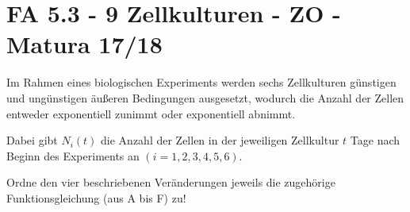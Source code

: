 \section{FA 5.3 - 9 Zellkulturen - ZO - Matura 17/18}

\begin{beispiel}[FA 5.3]{1} %
Im Rahmen eines biologischen Experiments werden sechs Zellkulturen günstigen und ungünstigen äußeren Bedingungen ausgesetzt, wodurch die Anzahl der Zellen entweder exponentiell zunimmt oder exponentiell abnimmt.

Dabei gibt $N_i(t)$ die Anzahl der Zellen in der jeweiligen Zellkultur $t$ Tage nach Beginn des Experiments an $(i=1,2,3,4,5,6)$.

Ordne den vier beschriebenen Veränderungen jeweils die zugehörige Funktionsgleichung (aus A bis F) zu!

\end{beispiel}